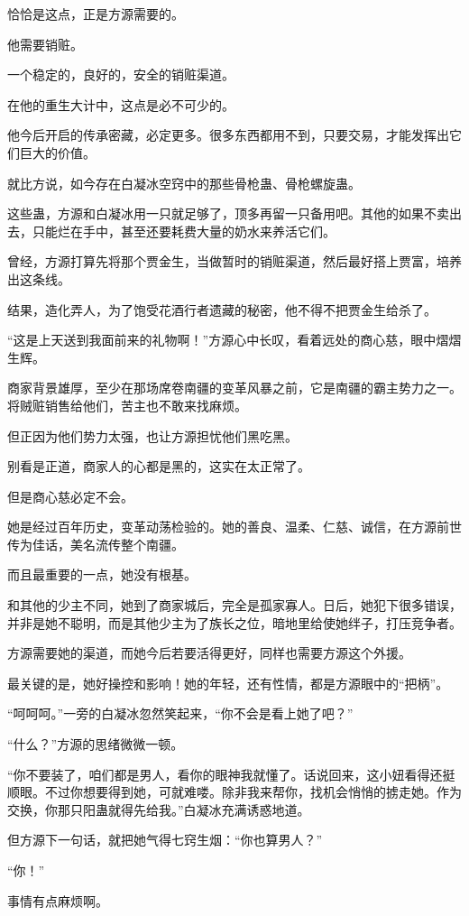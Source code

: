 \begin{this_body}
恰恰是这点，正是方源需要的。

他需要销赃。

一个稳定的，良好的，安全的销赃渠道。

在他的重生大计中，这点是必不可少的。

他今后开启的传承密藏，必定更多。很多东西都用不到，只要交易，才能发挥出它们巨大的价值。

就比方说，如今存在白凝冰空窍中的那些骨枪蛊、骨枪螺旋蛊。

这些蛊，方源和白凝冰用一只就足够了，顶多再留一只备用吧。其他的如果不卖出去，只能烂在手中，甚至还要耗费大量的奶水来养活它们。

曾经，方源打算先将那个贾金生，当做暂时的销赃渠道，然后最好搭上贾富，培养出这条线。

结果，造化弄人，为了饱受花酒行者遗藏的秘密，他不得不把贾金生给杀了。

“这是上天送到我面前来的礼物啊！”方源心中长叹，看着远处的商心慈，眼中熠熠生辉。

商家背景雄厚，至少在那场席卷南疆的变革风暴之前，它是南疆的霸主势力之一。将贼赃销售给他们，苦主也不敢来找麻烦。

但正因为他们势力太强，也让方源担忧他们黑吃黑。

别看是正道，商家人的心都是黑的，这实在太正常了。

但是商心慈必定不会。

她是经过百年历史，变革动荡检验的。她的善良、温柔、仁慈、诚信，在方源前世传为佳话，美名流传整个南疆。

而且最重要的一点，她没有根基。

和其他的少主不同，她到了商家城后，完全是孤家寡人。日后，她犯下很多错误，并非是她不聪明，而是其他少主为了族长之位，暗地里给使她绊子，打压竞争者。

方源需要她的渠道，而她今后若要活得更好，同样也需要方源这个外援。

最关键的是，她好操控和影响！她的年轻，还有性情，都是方源眼中的“把柄”。

“呵呵呵。”一旁的白凝冰忽然笑起来，“你不会是看上她了吧？”

“什么？”方源的思绪微微一顿。

“你不要装了，咱们都是男人，看你的眼神我就懂了。话说回来，这小妞看得还挺顺眼。不过你想要得到她，可就难喽。除非我来帮你，找机会悄悄的掳走她。作为交换，你那只阳蛊就得先给我。”白凝冰充满诱惑地道。

但方源下一句话，就把她气得七窍生烟：“你也算男人？”

“你！”

事情有点麻烦啊。


\end{this_body}
